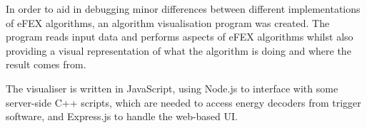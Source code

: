 In order to aid in debugging minor differences between different implementations
of \ac{eFEX} algorithms, an algorithm visualisation program was created.
%
The program reads input data and performs aspects of \ac{eFEX} algorithms whilst
also providing a visual representation of what the algorithm is doing and where
the result comes from.

The visualiser is written in JavaScript, using Node.js \cite{nodejs} to
interface with some server-side C++ scripts, which are needed to access energy
decoders from trigger software, and Express.js \cite{expressjs} to handle the
web-based \ac{UI}.
